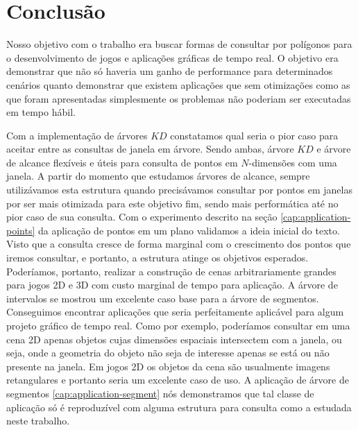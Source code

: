 \chapter{Conclusão}
Nosso objetivo com o trabalho era buscar formas de consultar por polígonos para o desenvolvimento de jogos e aplicações gráficas de tempo real. O objetivo era demonstrar que não só haveria um ganho de performance para determinados cenários quanto demonstrar que existem aplicações que sem otimizações como as que foram apresentadas simplesmente os problemas não poderiam ser executadas em tempo hábil.

Com a implementação de árvores $KD$ constatamos qual seria o pior caso para aceitar entre as consultas de janela em árvore. Sendo ambas, árvore $KD$ e árvore de alcance flexíveis e úteis para consulta de pontos em $N$-dimensões com uma janela. A partir do momento que estudamos árvores de alcance, sempre utilizávamos esta estrutura quando precisávamos consultar por pontos em janelas por ser mais otimizada para este objetivo fim, sendo mais performática até no pior caso de sua consulta. Com o experimento descrito na seção \ref{cap:application-points} da aplicação de pontos em um plano validamos a ideia inicial do texto. Visto que a consulta cresce de forma marginal com o crescimento dos pontos que iremos consultar, e portanto, a estrutura atinge os objetivos esperados. Poderíamos, portanto, realizar a construção de cenas arbitrariamente grandes para jogos 2D e 3D com custo marginal de tempo para aplicação. A árvore de intervalos se mostrou um excelente caso base para a árvore de segmentos. Conseguimos encontrar aplicações que seria perfeitamente aplicável para algum projeto gráfico de tempo real. Como por exemplo, poderíamos consultar em uma cena 2D apenas objetos cujas dimensões espaciais intersectem com a janela, ou seja, onde a geometria do objeto não seja de interesse apenas se está ou não presente na janela. Em jogos 2D os objetos da cena são usualmente imagens retangulares e portanto seria um excelente caso de uso. A aplicação de árvore de segmentos \ref{cap:application-segment} nós demonstramos que tal classe de aplicação só é reproduzível com alguma estrutura para consulta como a estudada neste trabalho. 


